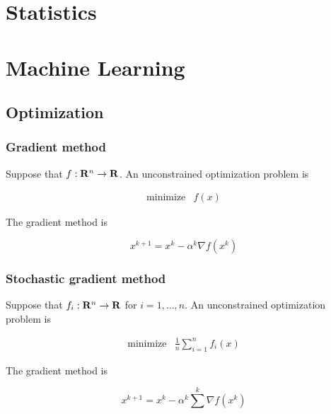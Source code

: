 \documentclass[10pt, twoside]{book}   	%
\begin{document}
\part{Statistics}


\part{Machine Learning}

\chapter{Optimization}

\section{Gradient method}


Suppose that $f:\mathbf{R}^n\to\mathbf{R}$. An unconstrained optimization problem is

\begin{equation}
\begin{array}{ll}
\mbox{minimize} & f(x)
\end{array}
\end{equation}

The gradient method is

\begin{equation}
x^{k+1} = x^{k} - \alpha^k \nabla f(x^k)
\end{equation}




\section{Stochastic gradient method}


Suppose that $f_i:\mathbf{R}^n\to\mathbf{R}$ for $i=1,\ldots,n$. An unconstrained optimization problem is

\begin{equation}
\begin{array}{ll}
\mbox{minimize} & \frac{1}{n} \sum_{i=1}^n f_i(x)
\end{array}
\end{equation}

The gradient method is

\begin{equation}
x^{k+1} = x^{k} - \alpha^k \sum_{}^k \nabla f(x^k)
\end{equation}
\end{document}
